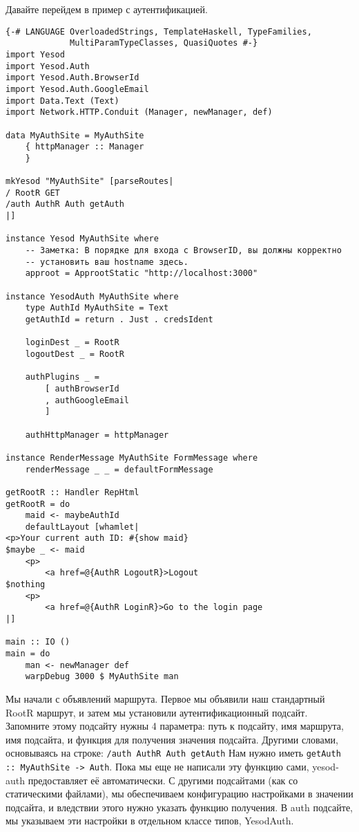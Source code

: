 Давайте перейдем в пример с аутентификацией.
\begin{lstlisting}
{-# LANGUAGE OverloadedStrings, TemplateHaskell, TypeFamilies,
             MultiParamTypeClasses, QuasiQuotes #-}
import Yesod
import Yesod.Auth
import Yesod.Auth.BrowserId
import Yesod.Auth.GoogleEmail
import Data.Text (Text)
import Network.HTTP.Conduit (Manager, newManager, def)

data MyAuthSite = MyAuthSite
    { httpManager :: Manager
    }

mkYesod "MyAuthSite" [parseRoutes|
/ RootR GET
/auth AuthR Auth getAuth
|]

instance Yesod MyAuthSite where
    -- Заметка: В порядке для входа с BrowserID, вы должны корректно
    -- установить ваш hostname здесь.
    approot = ApprootStatic "http://localhost:3000"

instance YesodAuth MyAuthSite where
    type AuthId MyAuthSite = Text
    getAuthId = return . Just . credsIdent

    loginDest _ = RootR
    logoutDest _ = RootR

    authPlugins _ =
        [ authBrowserId
        , authGoogleEmail
        ]

    authHttpManager = httpManager

instance RenderMessage MyAuthSite FormMessage where
    renderMessage _ _ = defaultFormMessage

getRootR :: Handler RepHtml
getRootR = do
    maid <- maybeAuthId
    defaultLayout [whamlet|
<p>Your current auth ID: #{show maid}
$maybe _ <- maid
    <p>
        <a href=@{AuthR LogoutR}>Logout
$nothing
    <p>
        <a href=@{AuthR LoginR}>Go to the login page
|]

main :: IO ()
main = do
    man <- newManager def
    warpDebug 3000 $ MyAuthSite man
\end{lstlisting}
Мы начали с объявлений маршрута. Первое мы объявили наш стандартный RootR маршрут, и затем мы установили аутентификационный подсайт. Запомните этому подсайту нужны 4 параметра: путь к подсайту, имя маршрута, имя подсайта, и функция для получения значения подсайта. Другими словами, основываясь на строке:
\lstinline'/auth AuthR Auth getAuth'
Нам нужно иметь \lstinline'getAuth :: MyAuthSite -> Auth'. Пока мы еще не написали эту функцию сами, yesod-auth предоставляет её автоматически. С другими подсайтами (как со статическими файлами), мы обеспечиваем конфигурацию настройками в значении подсайта, и вледствии этого нужно указать функцию получения. В auth подсайте, мы указываем эти настройки в отдельном классе типов, YesodAuth.
